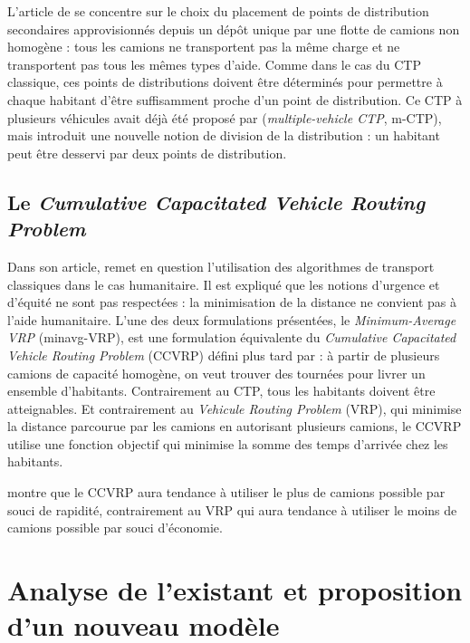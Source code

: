 \documentclass[5p,authoryear,square]{elsarticle}
\begin{document}
L’article de \cite{naji-azimi_covering_2012} se concentre sur le choix du placement de points de distribution secondaires approvisionnés depuis un dépôt unique par une flotte de camions non homogène : tous les camions ne transportent pas la même charge et ne transportent pas tous les mêmes types d'aide. Comme dans le cas du CTP classique, ces points de distributions doivent être déterminés pour permettre à chaque habitant d'être suffisamment proche d'un point de distribution. Ce CTP à plusieurs véhicules avait déjà été proposé par \cite{hachicha_heuristics_2000} (\emph{multiple-vehicle CTP}, m-CTP), mais \cite{naji-azimi_covering_2012} introduit une nouvelle notion de division de la distribution : un habitant peut être desservi par deux points de distribution. %

\subsection{Le \emph{Cumulative Capacitated Vehicle Routing Problem}} \label{ccvrp}

Dans son article, \cite{campbell_routing_2008} remet en question l'utilisation des algorithmes de transport classiques dans le cas humanitaire. Il est expliqué que les notions d'urgence et d'équité ne sont pas respectées : la minimisation de la distance ne convient pas à l'aide humanitaire. L'une des deux formulations présentées, le \emph{Minimum-Average VRP} (minavg-VRP), est une formulation équivalente du \emph{Cumulative Capacitated Vehicle Routing Problem} (CCVRP) défini plus tard par  \cite{ngueveu_effective_2010} : à partir de plusieurs camions de capacité homogène, on veut trouver des tournées pour livrer un ensemble d'habitants. Contrairement au CTP, tous les habitants doivent être atteignables. Et contrairement au \emph{Vehicule Routing Problem} (VRP), qui minimise la distance parcourue par les camions en autorisant plusieurs camions, le CCVRP utilise une fonction objectif qui minimise la somme des temps d'arrivée chez les habitants.

\cite{ngueveu_effective_2010} montre que le CCVRP  aura tendance à utiliser le plus de camions possible par souci de rapidité, contrairement au VRP qui aura tendance à utiliser le moins de camions possible par souci d'économie.

\section{Analyse de l'existant et proposition d'un nouveau modèle}
\end{document}
